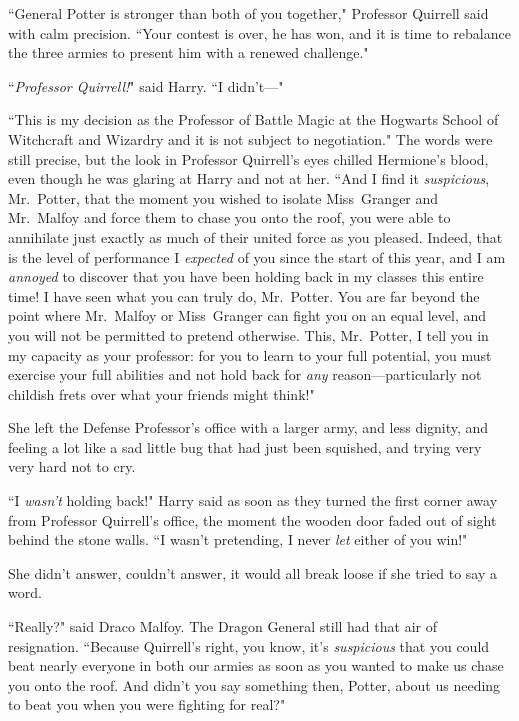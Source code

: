``General Potter is stronger than both of you together," Professor Quirrell said with calm precision. ``Your contest is over, he has won, and it is time to rebalance the three armies to present him with a renewed challenge."

``\emph{Professor Quirrell!}" said Harry. ``I didn't---"

``This is my decision as the Professor of Battle Magic at the Hogwarts School of Witchcraft and Wizardry and it is not subject to negotiation." The words were still precise, but the look in Professor Quirrell's eyes chilled Hermione's blood, even though he was glaring at Harry and not at her. ``And I find it \emph{suspicious}, Mr.~Potter, that the moment you wished to isolate Miss~Granger and Mr.~Malfoy and force them to chase you onto the roof, you were able to annihilate just exactly as much of their united force as you pleased. Indeed, that is the level of performance I \emph{expected} of you since the start of this year, and I am \emph{annoyed} to discover that you have been holding back in my classes this entire time! I have seen what you can truly do, Mr.~Potter. You are far beyond the point where Mr.~Malfoy or Miss~Granger can fight you on an equal level, and you will not be permitted to pretend otherwise. This, Mr.~Potter, I tell you in my capacity as your professor: for you to learn to your full potential, you must exercise your full abilities and not hold back for \emph{any} reason---particularly not childish frets over what your friends might think!"

\later

She left the Defense Professor's office with a larger army, and less dignity, and feeling a lot like a sad little bug that had just been squished, and trying very very hard not to cry.

``I \emph{wasn't} holding back!" Harry said as soon as they turned the first corner away from Professor Quirrell's office, the moment the wooden door faded out of sight behind the stone walls. ``I wasn't pretending, I never \emph{let} either of you win!"

She didn't answer, couldn't answer, it would all break loose if she tried to say a word.

``Really?" said Draco Malfoy. The Dragon General still had that air of resignation. ``Because Quirrell's right, you know, it's \emph{suspicious} that you could beat nearly everyone in both our armies as soon as you wanted to make us chase you onto the roof. And didn't you say something then, Potter, about us needing to beat you when you were fighting for real?"

